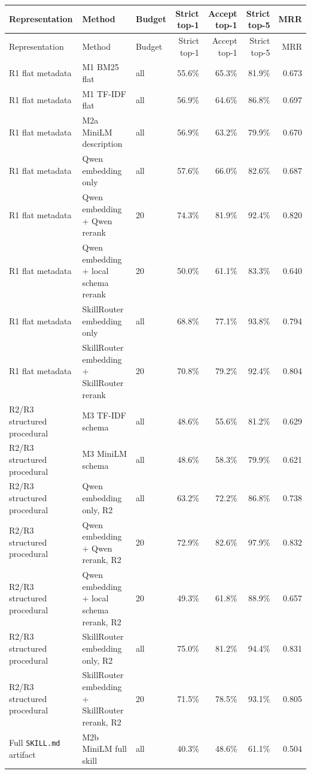 {\tiny
\setlength{\tabcolsep}{2pt}
\begin{longtable}{@{}p{}p{}p{}rrrr@{}}
\toprule
Representation & Method & Budget & Strict top-1 & Accept top-1 & Strict top-5 & MRR \\
\midrule
\endfirsthead
\toprule
Representation & Method & Budget & Strict top-1 & Accept top-1 & Strict top-5 & MRR \\
\midrule
\endhead
\bottomrule
\endfoot
R1 flat metadata & M1 BM25 flat & all & 55.6\% & 65.3\% & 81.9\% & 0.673 \\
R1 flat metadata & M1 TF-IDF flat & all & 56.9\% & 64.6\% & 86.8\% & 0.697 \\
R1 flat metadata & M2a MiniLM description & all & 56.9\% & 63.2\% & 79.9\% & 0.670 \\
R1 flat metadata & Qwen embedding only & all & 57.6\% & 66.0\% & 82.6\% & 0.687 \\
R1 flat metadata & Qwen embedding + Qwen rerank & 20 & 74.3\% & 81.9\% & 92.4\% & 0.820 \\
R1 flat metadata & Qwen embedding + local schema rerank & 20 & 50.0\% & 61.1\% & 83.3\% & 0.640 \\
R1 flat metadata & SkillRouter embedding only & all & 68.8\% & 77.1\% & 93.8\% & 0.794 \\
R1 flat metadata & SkillRouter embedding + SkillRouter rerank & 20 & 70.8\% & 79.2\% & 92.4\% & 0.804 \\
\midrule
R2/R3 structured procedural & M3 TF-IDF schema & all & 48.6\% & 55.6\% & 81.2\% & 0.629 \\
R2/R3 structured procedural & M3 MiniLM schema & all & 48.6\% & 58.3\% & 79.9\% & 0.621 \\
R2/R3 structured procedural & Qwen embedding only, R2 & all & 63.2\% & 72.2\% & 86.8\% & 0.738 \\
R2/R3 structured procedural & Qwen embedding + Qwen rerank, R2 & 20 & 72.9\% & 82.6\% & 97.9\% & 0.832 \\
R2/R3 structured procedural & Qwen embedding + local schema rerank, R2 & 20 & 49.3\% & 61.8\% & 88.9\% & 0.657 \\
R2/R3 structured procedural & SkillRouter embedding only, R2 & all & 75.0\% & 81.2\% & 94.4\% & 0.831 \\
R2/R3 structured procedural & SkillRouter embedding + SkillRouter rerank, R2 & 20 & 71.5\% & 78.5\% & 93.1\% & 0.805 \\
\midrule
Full \texttt{SKILL.md} artifact & M2b MiniLM full skill & all & 40.3\% & 48.6\% & 61.1\% & 0.504 \\

\end{longtable}}
